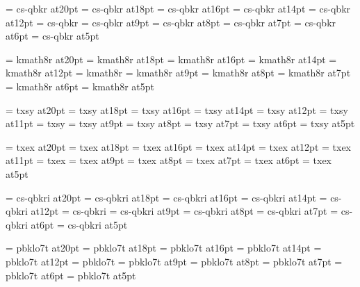 
\font\twentyrm=     cs-qbkr at20pt
\font\eighteenrm=   cs-qbkr at18pt
\font\sixteenrm=    cs-qbkr at16pt
\font\fourteenrm=   cs-qbkr at14pt
\font\twelverm=     cs-qbkr at12pt
\font\tenrm=        cs-qbkr %
\font\ninerm=       cs-qbkr at9pt
\font\eightrm=      cs-qbkr at8pt
\font\sevenrm=      cs-qbkr at7pt
\font\sixrm=        cs-qbkr at6pt
\font\fiverm=       cs-qbkr at5pt

\font\twentyi=      kmath8r at20pt
\font\eighteeni=    kmath8r at18pt
\font\sixteeni=     kmath8r at16pt
\font\fourteeni=    kmath8r at14pt
\font\twelvei=      kmath8r at12pt
\font\teni=         kmath8r
\font\ninei=        kmath8r at9pt
\font\eighti=       kmath8r at8pt
\font\seveni=       kmath8r at7pt
\font\sixi=         kmath8r at6pt
\font\fivei=        kmath8r at5pt

\font\twentysy=     txsy at20pt
\font\eighteensy=   txsy at18pt
\font\sixteensy=    txsy at16pt
\font\fourteensy=   txsy at14pt
\font\twelvesy=     txsy at12pt
\font\elevensy=     txsy at11pt
\font\tensy=        txsy
\font\ninesy=       txsy at9pt
\font\eightsy=      txsy at8pt
\font\sevensy=      txsy at7pt
\font\sixsy=        txsy at6pt
\font\fivesy=       txsy at5pt

\font\twentyex=     txex at20pt
\font\eighteenex=   txex at18pt
\font\sixteenex=    txex at16pt
\font\fourteenex=   txex at14pt
\font\twelveex=     txex at12pt
\font\elevenex=     txex at11pt
\font\tenex=        txex
\font\nineex=       txex at9pt
\font\eightex=      txex at8pt
\font\sevenex=      txex at7pt
\font\sixex=        txex at6pt
\font\fiveex=       txex at5pt

\font\twentyit=     cs-qbkri at20pt
\font\eighteenit=   cs-qbkri at18pt
\font\sixteenit=    cs-qbkri at16pt
\font\fourteenit=   cs-qbkri at14pt
\font\twelveit=     cs-qbkri at12pt
\font\tenit=        cs-qbkri
\font\nineit=       cs-qbkri at9pt
\font\eightit=      cs-qbkri at8pt
\font\sevenit=      cs-qbkri at7pt
\font\sixit=        cs-qbkri at6pt
\font\fiveit=       cs-qbkri at5pt

\font\twentysl=     pbklo7t at20pt
\font\eighteensl=   pbklo7t at18pt
\font\sixteensl=    pbklo7t at16pt
\font\fourteensl=   pbklo7t at14pt
\font\twelvesl=     pbklo7t at12pt
\font\tensl=        pbklo7t
\font\ninesl=       pbklo7t at9pt
\font\eightsl=      pbklo7t at8pt
\font\sevensl=      pbklo7t at7pt
\font\sixsl=        pbklo7t at6pt
\font\fivesl=       pbklo7t at5pt

